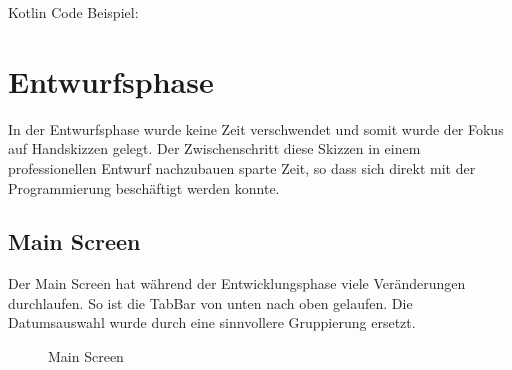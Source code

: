 \documentclass[
    DIV12,
    cleardouble=plain,
    headings=normal,
    pdftex,
    headexclude,footexclude,
    final
]{scrreprt}
\begin{document}
Kotlin Code Beispiel:


\newpage

\chapter{Entwurfsphase}
In der Entwurfsphase wurde keine Zeit verschwendet und somit wurde der Fokus auf Handskizzen gelegt. Der Zwischenschritt diese Skizzen in einem professionellen Entwurf nachzubauen sparte Zeit, so dass sich direkt mit der Programmierung beschäftigt werden konnte.



\section{Main Screen}
Der Main Screen hat während der Entwicklungsphase viele Veränderungen durchlaufen. So ist die TabBar von unten nach oben gelaufen. Die Datumsauswahl wurde durch eine sinnvollere Gruppierung ersetzt.
\begin{figure}[H]
	\centering
	\caption{Main Screen}
	\label{main}
\end{figure}
\end{document}
